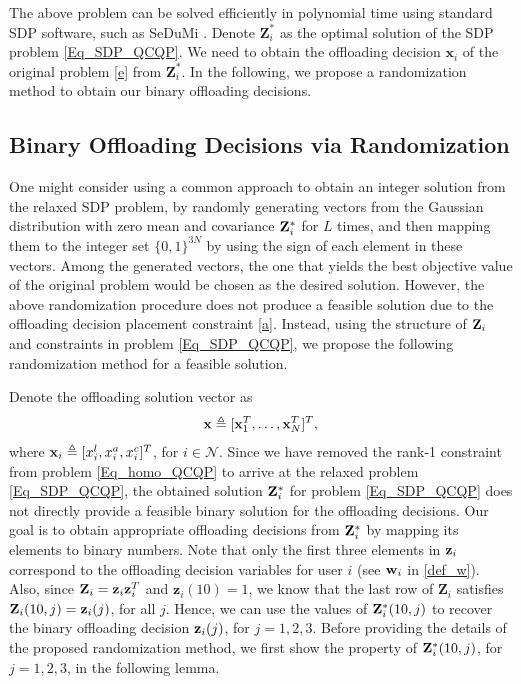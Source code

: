 \documentclass[10pt,journal,compsoc]{IEEEtran}
\def\wbf{{\bf w}}
\def\xbf{{\bf x}}
\def\zbf{{\bf z}}
\def\xbf{{\bf x}}
\def\Zbf{{\bf Z}}
\begin{document}
{The above problem can be solved efficiently in polynomial time using
standard SDP software, such as SeDuMi \cite{grant2009}. Denote
$\mathbf{Z}_i^*$ as the optimal solution of the SDP problem
\eqref{Eq_SDP_QCQP}. We need to obtain the offloading decision
$\mathbf{x}_i$ of the original problem \eqref{e} from
$\mathbf{Z}_i^*$. In the following, we propose a randomization
method to obtain our binary
offloading decisions. %
\subsection{Binary Offloading Decisions via Randomization}\label{sec_randomization}
One might consider using a common approach \cite{luo2010} to obtain
an integer solution from the relaxed SDP problem, by randomly
generating vectors from the Gaussian distribution with zero mean and
covariance $\Zbf_i^*$ for $L$ times, and then mapping them to the
integer set $\{0,1\}^{3N}$ by using the sign of each element in
these vectors. Among the generated vectors, the one that yields the
best objective value of the original problem would be chosen as the
desired solution. However, the above randomization procedure does
not produce a feasible solution due to the offloading decision
placement constraint \eqref{a}. Instead, using the structure of
$\Zbf_i$ and constraints in problem \eqref{Eq_SDP_QCQP}, we propose
the following randomization method for a feasible solution.

 Denote the offloading solution vector as
\begin{align}
\xbf \triangleq [\xbf_1^T,\ldots, \xbf_N^T]^T,\nonumber
\end{align}
where $\xbf_i \triangleq [x^l_{i},x^a_{i},x^c_{i}]^T$, for
$i\in\mathcal{N}$. Since we have removed the rank-1 constraint from
problem \eqref{Eq_homo_QCQP} to arrive at the relaxed problem
\eqref{Eq_SDP_QCQP}, the obtained solution $\Zbf_i^*$ for problem
\eqref{Eq_SDP_QCQP} does not directly provide a feasible binary
solution for the offloading decisions. Our goal is to obtain
appropriate offloading decisions from $\Zbf_i^*$ by mapping its
elements to binary numbers. Note that only the first three elements
in $\zbf_i$ correspond to the offloading decision variables for user
$i$ (see $\wbf_i$ in \eqref{def_w}). Also, since
$\mathbf{Z}_i=\zbf_i\zbf_i^T$ and $\mathbf{z}_i(10)=1$, we know that
the last row of $\mathbf{Z}_i$ satisfies $\Zbf_i(10,j)=\zbf_i(j)$,
for all $j$. Hence, we can use the values of $\Zbf^*_i(10,j)$ to
recover the binary offloading decision $\zbf_i(j)$, for $j=1,2,3$.
Before providing the details of the proposed randomization method,
we first show the property of $\Zbf^*_i(10,j)$, for $j=1,2,3$, in
the following lemma.




}
\end{document}
